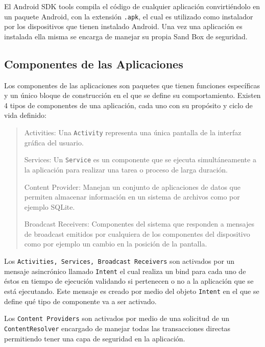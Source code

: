 \documentclass[letterpaper,12pt]{book}
\begin{document}
\begin{mainmatter}
\begin{itemize}
\end{itemize}

El  Android  SDK  tools  compila  el código  de  cualquier  aplicación
convirtiéndolo en un  paquete Android, con la extensión  \texttt{.apk}, el cual
es utilizado como instalador por los dispositivos que tienen instalado
Android. Una vez una aplicación  es instalada ella misma se encarga de
manejar su propia Sand Box de seguridad.

\subsection{Componentes de las  Aplicaciones}

Los componentes de las  aplicaciones son paquetes que tienen funciones
específicas y un  único bloque de construcción en el  que se define su
comportamiento. Existen 4 tipos de componentes de una aplicación, cada
uno con su propósito y ciclo de vida definido:

\begin{quote}

\textsf{Activities}: Una \texttt{Activity} representa  una única pantalla de la interfaz
gráfica del usuario.

\textsf{Services}: Un \texttt{Service} es un componente que se ejecuta simultáneamente a
la aplicación para realizar una tarea o proceso de larga duración.

\textsf{Content  Provider}: Manejan un  conjunto de  aplicaciones de  datos que
permiten  almacenar información  en un  sistema de  archivos  como por
ejemplo SQLite.

\textsf{Broadcast Receivers}: Componentes del  sistema que responden a mensajes
de  broadcast   emitidos  por   cualquiera  de  los   componentes  del
dispositivo como por ejemplo un cambio en la posición de la pantalla.
\end{quote}

Los  \verb|Activities, Services, Broadcast Receivers|  son activados  por un
mensaje asincrónico llamado  \texttt{Intent} el cual realiza un  bind para cada
uno de éstos en tiempo de  ejecución validando si pertenecen o no a la
aplicación que  se está ejecutando.  Este mensaje es creado  por medio
del objeto \texttt{Intent} en el que se  define qué tipo de componente va a ser
activado.

Los \texttt{Content Providers}  son activados por medio de  una solicitud de un
\texttt{ContentResolver} encargado de  manejar todas las transacciones directas
permitiendo tener una capa de seguridad en la aplicación.



\end{mainmatter}
\end{document}
